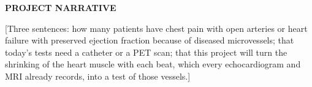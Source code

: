 \documentclass[11pt]{article}
\begin{document}
\textbf{PROJECT NARRATIVE}

[Three sentences: how many patients have chest pain with open arteries or heart failure with preserved ejection fraction because of diseased microvessels; that today's tests need a catheter or a PET scan; that this project will turn the shrinking of the heart muscle with each beat, which every echocardiogram and MRI already records, into a test of those vessels.]
\end{document}
